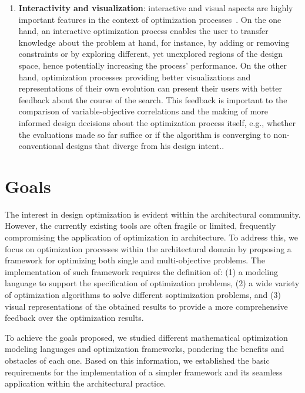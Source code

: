 \begin{enumerate}
\item \textbf{Interactivity and visualization}: interactive and visual aspects are highly important features in the context of optimization processes~\cite{Ashour2015CreativelyMOO}. On the one hand, an interactive optimization process enables the user to transfer knowledge about the problem at hand, for instance, by adding or removing constraints or by exploring different, yet unexplored regions of the design space, hence potentially increasing the process' performance. On the other hand, optimization processes providing better visualizations and representations of their own evolution can present their users with better feedback about the course of the search. This feedback is important to the comparison of variable-objective correlations and the making of more informed design decisions about the optimization process itself, e.g., whether the evaluations made so far suffice or if the algorithm is converging to non-conventional designs that diverge from his design intent..
\end{enumerate}


\section{Goals}
The interest in design optimization is evident within the architectural community. However, the currently existing tools are often fragile or limited, frequently compromising the application of optimization in architecture. To address this, we focus on optimization processes within the architectural domain by proposing a framework for optimizing both single and multi-objective problems. The implementation of such framework requires the definition of: (1) a modeling language to support the specification of optimization problems, (2) a wide variety of optimization algorithms to solve different soptimization problems, and (3) visual representations of the obtained results to provide a more comprehensive feedback over the optimization results.

To achieve the goals proposed, we studied different mathematical optimization modeling languages and optimization frameworks, pondering the benefits and obstacles of each one. Based on this information, we established the basic requirements for the implementation of a simpler framework and its seamless application within the architectural practice. 

